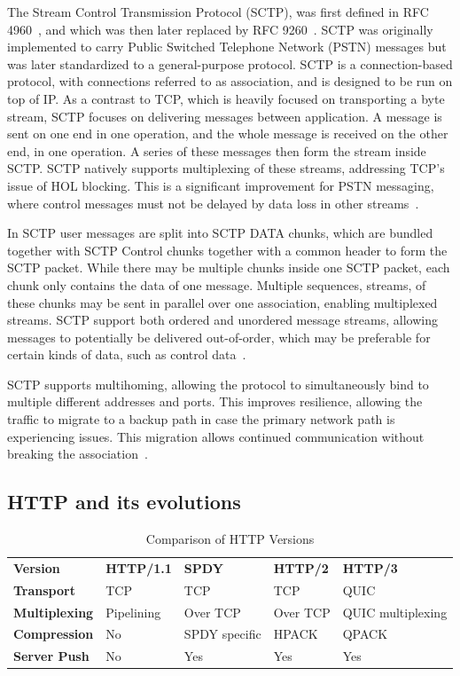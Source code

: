 \documentclass[english, 12pt, a4paper, elec, utf8, a-2b, online]{aaltothesis}
\begin{document}
The Stream Control Transmission Protocol (SCTP), was first defined in RFC 4960~\cite{rfc4960}, and
which was then later replaced by RFC 9260~\cite{rfc4960}. SCTP was originally implemented
to carry Public Switched Telephone Network (PSTN) messages but was later standardized
to a general-purpose protocol. SCTP is a connection-based protocol, with connections
referred to as association, and is designed to be run on top of IP. As a contrast
to TCP, which is heavily focused on transporting a byte stream, SCTP focuses on delivering
messages between application. A message is sent on one end in one operation, and
the whole message is received on the other end, in one operation. A series of these
messages then form the stream inside SCTP. SCTP natively supports multiplexing of these streams, addressing TCP's issue
of HOL blocking. This is a significant improvement for PSTN messaging, where control
messages must not be delayed by data loss in other streams~\cite{rfc9260}.

In SCTP user messages are split into SCTP DATA chunks, which are bundled together
with SCTP Control chunks together with a common header to form the SCTP packet. While
there may be multiple chunks inside one SCTP packet, each chunk only contains the data
of one message. Multiple sequences, streams, of these chunks may be sent in parallel
over one association, enabling multiplexed streams. SCTP support both ordered and
unordered message streams, allowing messages to potentially be delivered out-of-order,
which may be preferable for certain kinds of data, such as control data~\cite{rfc9260}.

SCTP supports multihoming, allowing the protocol to simultaneously bind to multiple
different addresses and ports. This improves resilience, allowing the traffic to migrate
to a backup path in case the primary network path is experiencing issues. This migration
allows continued communication without breaking the association~\cite{rfc9260}.

\subsection{HTTP and its evolutions}

\begin{table}[h]
	\centering
	\caption{Comparison of HTTP Versions}
	\label{tab:http_versions}
	\begin{tabular}{lllll}
	\textbf{Version} & \textbf{HTTP/1.1} & \textbf{SPDY} & \textbf{HTTP/2} & \textbf{HTTP/3} \\
	\textbf{Transport}    & TCP     & TCP & TCP & QUIC    \\
	\textbf{Multiplexing} & Pipelining    & Over TCP & Over TCP & QUIC multiplexing    \\
	\textbf{Compression}  & No    & SPDY specific & HPACK & QPACK    \\
	\textbf{Server Push} & No & Yes & Yes & Yes \\
	\end{tabular}
\end{table}
\end{document}
